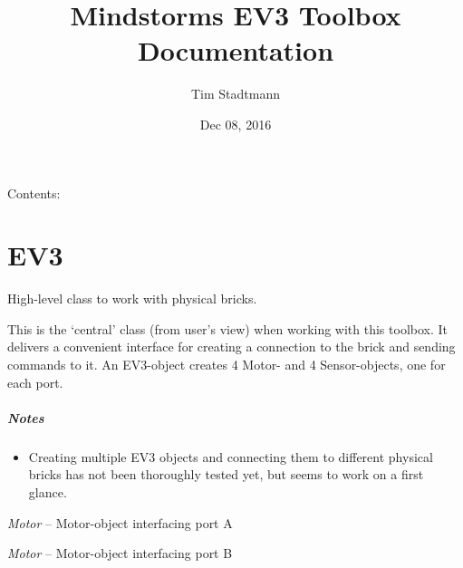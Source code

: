 \documentclass[letterpaper,10pt,english]{sphinxmanual}
\title{Mindstorms EV3 Toolbox Documentation}
\date{Dec 08, 2016}
\author{Tim Stadtmann}
\begin{document}
\maketitle
\tableofcontents
{}\label{index::doc}


Contents:
\label{source:module-source}

\chapter{EV3}
\label{source:ev3}\label{source::doc}\label{source:toolbox-for-controlling-lego-mindstorms-ev3-with-matlab}

\begin{fulllineitems}
\label{source:source.EV3}
High-level class to work with physical bricks.

This is the `central' class (from user's view) when working with this toolbox. It
delivers a convenient interface for creating a connection to the brick and sending
commands to it. An EV3-object creates 4 Motor- and 4 Sensor-objects, one for each port.
\paragraph{Notes}
\begin{itemize}
\item {} 
Creating multiple EV3 objects and connecting them to different physical bricks has not
been thoroughly tested yet, but seems to work on a first glance.

\end{itemize}

\begin{fulllineitems}
\label{source:source.EV3.motorA}
\emph{Motor} -- Motor-object interfacing port A

\end{fulllineitems}


\begin{fulllineitems}
\label{source:source.EV3.motorB}
\emph{Motor} -- Motor-object interfacing port B

\end{fulllineitems}


\end{fulllineitems}
\end{document}

